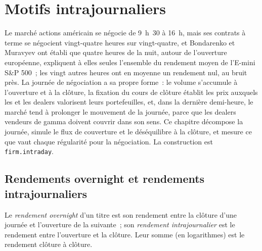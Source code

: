 \chapter{Motifs intrajournaliers}\label{ch:s1:intraday-patterns}

Le marché actions américain se négocie de 9~h~30 à 16~h, mais ses contrats à terme se négocient vingt-quatre heures sur vingt-quatre, et Bondarenko et Muravyev ont établi que quatre heures de la nuit,
autour de l'ouverture européenne, expliquent à elles seules l'ensemble du rendement moyen de l'E-mini S\&P 500~; les vingt autres heures ont en moyenne un rendement nul, au bruit près. La journée de négociation a
sa propre forme~: le volume s'accumule à l'ouverture et à la clôture, la fixation du cours de clôture établit les prix auxquels les  et les dealers valorisent leurs portefeuilles, et, dans la dernière
demi-heure, le marché tend à prolonger le mouvement de la journée, parce que les dealers vendeurs de gamma doivent couvrir dans son sens. Ce chapitre décompose la
journée, simule le flux de couverture et le déséquilibre à la clôture, et mesure ce que vaut chaque régularité pour la négociation. La construction est \texttt{firm.intraday}.

\section{Rendements overnight et rendements intrajournaliers}

\begin{definition}\label{def:s1:intraday-patterns:returns}
Le \emph{rendement overnight} d'un titre est son rendement entre la clôture d'une journée et l'ouverture de la suivante~; son \emph{rendement
intrajournalier} est le rendement entre l'ouverture et la clôture. Leur somme (en logarithmes) est le rendement clôture à clôture.
\end{definition}

